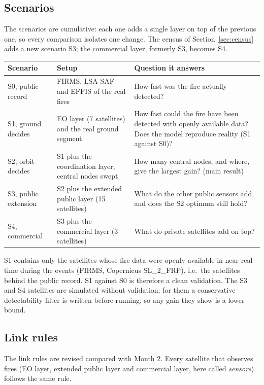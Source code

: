 \documentclass[11pt]{article}
\begin{document}
\subsection{Scenarios}

The scenarios are cumulative: each one adds a single layer on top of the previous one, so every comparison isolates one change. The census of Section~\ref{sec:census} adds a new scenario S3; the commercial layer, formerly S3, becomes S4.

\begin{longtable}{|p{3.2cm}|p{5.0cm}|p{6.6cm}|}
\hline
\rowcolor{tablehead}
\textbf{Scenario} & \textbf{Setup} & \textbf{Question it answers} \\
\hline
\endhead
S0, public record & FIRMS, LSA SAF and EFFIS of the real fires & How fast was the fire actually detected? \\
\hline
S1, ground decides & EO layer (7 satellites) and the real ground segment & How fast could the fire have been detected with openly available data? Does the model reproduce reality (S1 against S0)? \\
\hline
S2, orbit decides & S1 plus the coordination layer; central nodes swept & How many central nodes, and where, give the largest gain? (main result) \\
\hline
S3, public extension & S2 plus the extended public layer (15 satellites) & What do the other public sensors add, and does the S2 optimum still hold? \\
\hline
S4, commercial & S3 plus the commercial layer (3 satellites) & What do private satellites add on top? \\
\hline
\end{longtable}

S1 contains only the satellites whose fire data were openly available in near real time during the events (FIRMS, Copernicus SL\_2\_FRP), i.e.\ the satellites behind the public record. S1 against S0 is therefore a clean validation. The S3 and S4 satellites are simulated without validation; for them a conservative detectability filter is written before running, so any gain they show is a lower bound.

\subsection{Link rules}

The link rules are revised compared with Month 2. Every satellite that observes fires (EO layer, extended public layer and commercial layer, here called \emph{sensors}) follows the same rule.
\end{document}
